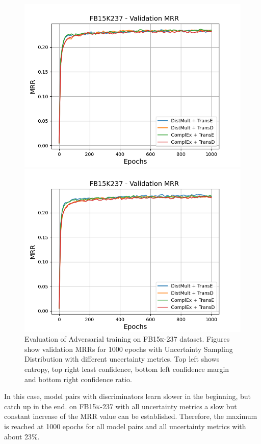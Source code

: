 \begin{figure}
\begin{minipage}{.5\textwidth}
    \end{minipage}
    \begin{minipage}{.5\textwidth}
      \centering
      \includegraphics[width=0.9\linewidth]{figures/results/gan_train/not_pretrained/uncertainty/max_distribution/confidence_margin/fb15k237/uncertainty_fb15k237_mrrs.png}
    \end{minipage}%
    \begin{minipage}{.5\textwidth}
      \centering
      \includegraphics[width=0.9\linewidth]{figures/results/gan_train/not_pretrained/uncertainty/max_distribution/confidence_ratio/fb15k237/uncertainty_fb15k237_mrrs.png}
    \end{minipage}%
    \caption{Evaluation of Adversarial training on \textsc{FB15k-237} dataset. 
    Figures show validation MRRs for 1000 epochs with Uncertainty Sampling Distribution with different uncertainty metrics.
    Top left shows entropy, top right least confidence, 
    bottom left confidence margin and bottom right confidence ratio.}
    \label{fig:advtrain_measures_fb15k237}
\end{figure}
In this case, model pairs with \transd discriminators learn slower in the beginning, but catch up in the end.
on \textsc{FB15k-237} with all uncertainty metrics a slow but constant increase of the MRR value can be established.
Therefore, the maximum is reached at 1000 epochs for all model pairs and all uncertainty metrics with about 23\%.


